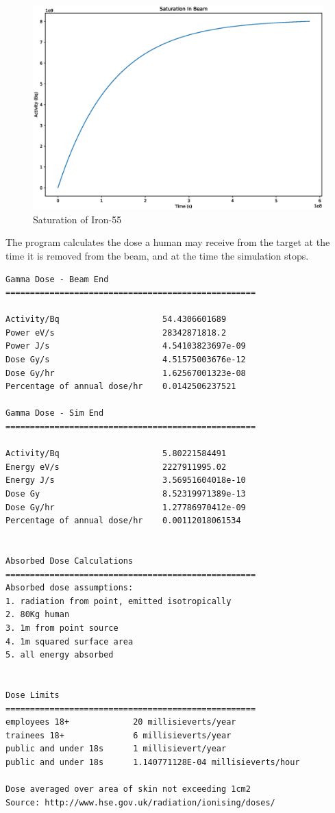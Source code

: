 \documentclass[12pt,twoside]{manual}
\begin{document}
\begin{figure}[h]
  \begin{center}
    \includegraphics[scale=0.25]{img/saturation_Fe55.eps}
  \end{center}
  \caption{Saturation of Iron-55}
\end{figure}

\FloatBarrier

The program calculates the dose a human may receive from the target at the time it is removed from the beam, and at the time the simulation stops.

\begin{lstlisting}[style=inputfile, caption={Predicted Dose}]
Gamma Dose - Beam End
===================================================

Activity/Bq                     54.4306601689
Power eV/s                      28342871818.2
Power J/s                       4.54103823697e-09
Dose Gy/s                       4.51575003676e-12
Dose Gy/hr                      1.62567001323e-08
Percentage of annual dose/hr    0.0142506237521

Gamma Dose - Sim End
===================================================

Activity/Bq                     5.80221584491
Energy eV/s                     2227911995.02
Energy J/s                      3.56951604018e-10
Dose Gy                         8.52319971389e-13
Dose Gy/hr                      1.27786970412e-09
Percentage of annual dose/hr    0.00112018061534


Absorbed Dose Calculations
===================================================
Absorbed dose assumptions:
1. radiation from point, emitted isotropically
2. 80Kg human
3. 1m from point source
4. 1m squared surface area
5. all energy absorbed


Dose Limits
===================================================
employees 18+             20 millisieverts/year
trainees 18+              6 millisieverts/year
public and under 18s      1 millisievert/year
public and under 18s      1.140771128E-04 millisieverts/hour

Dose averaged over area of skin not exceeding 1cm2
Source: http://www.hse.gov.uk/radiation/ionising/doses/
\end{lstlisting}
\end{document}
